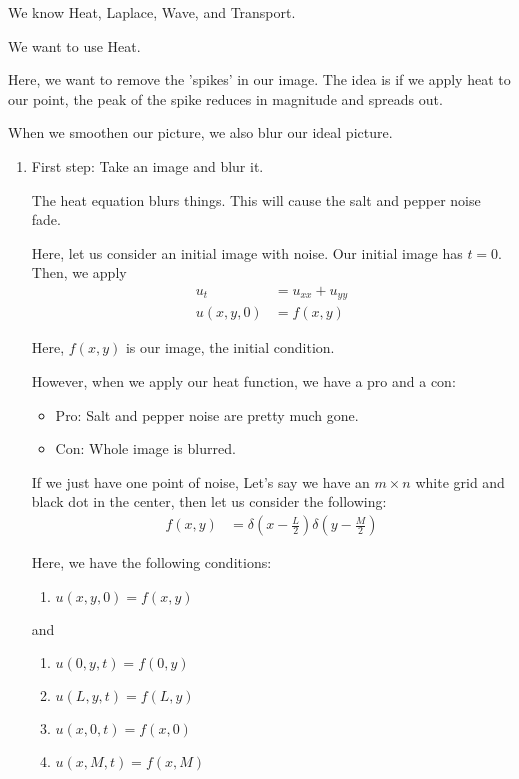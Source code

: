 \documentclass{article}
\begin{document}
We know Heat, Laplace, Wave, and Transport.

We want to use Heat.


Here, we want to remove the 'spikes' in our image. The idea is if we apply heat to our point, the peak of the spike reduces in magnitude and spreads out.

When we smoothen our picture, we also blur our ideal picture.

\begin{enumerate}
  \item First step: Take an image and blur it.

  The heat equation blurs things. This will cause the salt and pepper noise fade.

  Here, let us consider an initial image with noise. Our initial image has $t = 0$. Then, we apply
  \begin{align}
    u_t & = u_{xx} + u_{yy}\\
    u(x, y, 0) & = f(x, y)
  \end{align}

  Here, $f(x, y)$ is our image, the initial condition.

  However, when we apply our heat function, we have a pro and a con:
  \begin{itemize}
    \item Pro: Salt and pepper noise are pretty much gone.
    \item Con: Whole image is blurred.
  \end{itemize}

  If we just have one point of noise, Let's say we have an $m \times n$ white grid and black dot in the center,
  then let us consider the following:
  \begin{align}
    f(x, y) & = \delta\left(x - \frac{L}{2}\right) \delta\left(y - \frac{M}{2}\right)
  \end{align}

  Here, we have the following conditions:
  \begin{enumerate}
    \item $u(x, y, 0) = f(x, y)$
  \end{enumerate}

  and
  \begin{enumerate}
    \item $u(0, y, t) = f(0, y)$
    \item $u(L, y, t) = f(L, y)$
    \item $u(x, 0, t) = f(x, 0)$
    \item $u(x, M, t) = f(x, M)$
  \end{enumerate}
\end{enumerate}
\end{document}
